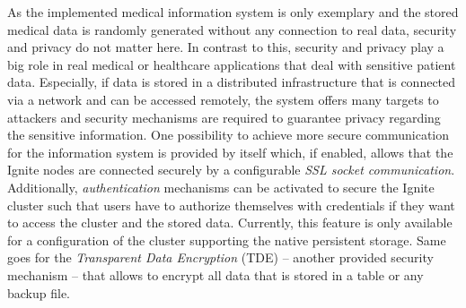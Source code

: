 As the implemented medical information system is only exemplary and the stored medical data is randomly generated without any connection to real data, security and
privacy do not matter here. In contrast to this, security and privacy play a big role in real medical or healthcare applications that deal with sensitive patient
data. Especially, if data is stored in a distributed infrastructure that is connected via a network and can be accessed remotely, the system offers many targets
to attackers and security mechanisms are required to guarantee privacy regarding the sensitive information. One possibility to achieve more secure communication 
for the information system is provided by  itself which, if enabled, allows that the Ignite nodes are connected securely by a configurable 
\emph{SSL socket communication}. Additionally, \emph{authentication} mechanisms can be activated to secure the Ignite cluster such that users have to authorize 
themselves with credentials if they want to access the cluster and the stored data. Currently, this feature is only available for a configuration of the cluster
supporting the native persistent storage. Same goes for the \emph{Transparent Data Encryption} (TDE) -- another provided security mechanism -- that allows to 
encrypt all data that is stored in a table or any backup file.

